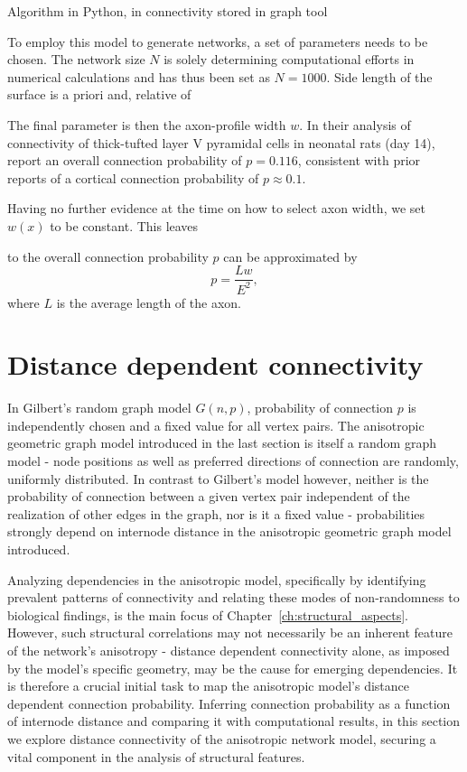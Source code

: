 Algorithm in Python, in connectivity stored in graph
tool \parencite{graph_tool} %



To employ this model to generate networks, a set of parameters needs to be
chosen. The network size $N$ is solely determining computational
efforts in numerical calculations and has thus been set as
$N = 1000$. Side length of the surface is a priori and, relative of

The final parameter is then the axon-profile width $w$. In their
analysis of connectivity of thick-tufted layer V pyramidal cells in
neonatal rats (day 14), \textcite{Song2005} report an overall connection
probability of $p=0.116$, consistent with prior reports of a cortical
connection probability of $p \approx 0.1$. %




Having no further evidence at the time on how to select axon width, we
set $w(x)$ to be constant. This leaves 

to the overall connection probability $p$ can be approximated by
\[
p = \frac{L w}{E^2},
\]
where $L$ is the average length of the axon. 




\newpage
\section{Distance dependent connectivity}\label{sec:dist_depend_con}

In Gilbert's random graph model $G(n,p)$, 
probability of connection $p$ is independently chosen and a fixed
value for all vertex pairs. The anisotropic geometric graph model
introduced in the last %
section is itself a random graph model - node positions as well as
preferred directions of connection are randomly, uniformly
distributed. In contrast to Gilbert's model however, neither is the
probability of connection between a given vertex pair independent of
the realization of other edges in the graph, nor is it a fixed value -
probabilities strongly depend on internode distance in the
anisotropic geometric graph model introduced.

Analyzing dependencies in the anisotropic model, specifically by
identifying prevalent patterns of connectivity and relating these
modes of non-randomness to biological findings, is the main focus of
Chapter~\ref{ch:structural_aspects}. However, such structural
correlations may not necessarily be an inherent feature of the
network's anisotropy - distance dependent connectivity alone, as
imposed by the model's specific geometry, may be the cause for
emerging dependencies. It is therefore a crucial initial task to map
the anisotropic model's distance dependent connection
probability. Inferring connection probability as a function of
internode distance and comparing it with computational results, in
this section we explore distance connectivity of the anisotropic
network model, securing a vital component in the analysis of
structural features.

